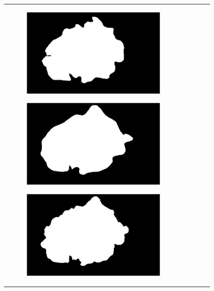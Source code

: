 \documentclass[a4paper, 10pt, conference]{ieeeconf}        %
\begin{document}
\begin{figure}[ht!]
\begin{tabular}{c c c c c}
\begin{subfigure}{0.2\textwidth}
     \end{subfigure}
     \begin{subfigure}{0.2\textwidth}
      \includegraphics[scale=0.2]{expert_2GroundTrue_03.JPG}
      \end{subfigure} 
     \begin{subfigure}{0.2\textwidth}
      \includegraphics[scale=0.2]{expert_3GroundTrue_03.JPG}
      \end{subfigure} 
     \begin{subfigure}{0.2\textwidth}
      \includegraphics[scale=0.2]{finalGroundTrue_03.JPG}

\end{subfigure}
\end{tabular}
\end{figure}
\end{document}
